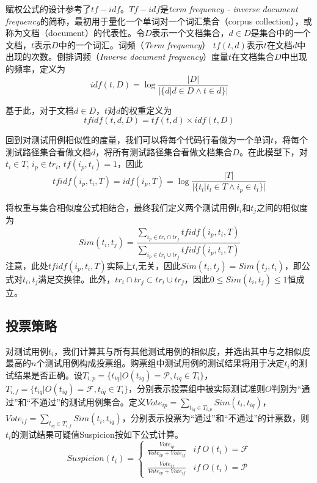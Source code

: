 赋权公式的设计参考了$tf-idf$\cite{wiki:tf-idf}。$Tf-idf$是\textit{term frequency - inverse document frequency}的简称，最初用于量化一个单词对一个词汇集合（corpus collection），或称为文档（document）的代表性。令$D$表示一个文档集合，$d \in D$是集合中的一个文档，$t$表示$D$中的一个词汇。词频（\textit{Term frequency}） $tf(t, d)$表示$t$在文档$d$中出现的次数。倒排词频（\textit{Inverse document frequency}）度量$t$在文档集合$D$中出现的频率，定义为
$$
idf(t, D) = \log{\frac{|D|}{|\{d| d \in D \wedge t \in d\}|}}
$$

基于此，对于文档$d \in D$，$t$对$d$的权重定义为
$$tfidf(t, d, D) = tf(t, d) \times idf(t, D)
$$

回到对测试用例相似性的度量，我们可以将每个代码行看做为一个单词$t$，将每个测试路径集合看做文档$d$，将所有测试路径集合看做文档集合$D$。在此模型下，对$t_i \in T$, $i_p \in tr_i$, $tf(i_p, t_i) = 1$，因此
$$
tfidf(i_p, t_i, T) = idf(i_p, T) = \log{\frac{|T|}{|\{t_l|t_l \in T \wedge i_p \in t_l\}|}}
$$

将权重与集合相似度公式相结合，最终我们定义两个测试用例$t_i$和$t_j$之间的相似度为
$$
Sim (t_i, t_j) = \frac{\sum_{i_p \in {tr}_i \cap {tr}_j}^{} tfidf(i_p, t_i, T)}{\sum_{i_p \in {tr}_i \cup {tr}_j}^{} tfidf(i_p, t_i, T)}
$$
注意，此处$tfidf(i_p, t_i, T)$实际上$t_i$无关，因此$Sim(t_i, t_j) = Sim(t_j, t_i)$，即公式对$t_i,t_j$满足交换律。此外，${tr}_i \cap {tr}_j \subset {tr}_i \cup {tr}_j$，因此$0 \le Sim(t_i, t_j) \le 1$恒成立。

\subsection{投票策略}
对测试用例$t_i$，我们计算其与所有其他测试用例的相似度，并选出其中与之相似度最高的$n$个测试用例构成投票组。购票组中测试用例的测试结果将用于决定$t_i$的测试结果是否正确。设$T_{i, p} = \{t_{iq} | O(t_{iq}) = \mathcal{P}, t_{iq}\in T_i\}$， $T_{i, f} = \{t_{iq} | O(t_{iq}) = \mathcal{F}, t_{iq}\in T_i\}$，分别表示投票组中被实际测试准则$O$判别为“通过”和“不通过”的测试用例集合。定义$Vote_{ip} = \sum_{t_{iq} \in T_{i, p}} Sim(t_i, t_{iq})$，$Vote_{if} = \sum_{t_{iq} \in T_{i, f}} Sim(t_i, t_{iq})$，分别表示投票为“通过”和“不通过”的计票数，则$t_i$的测试结果可疑值Suspicion按如下公式计算。
$$
Suspicion(t_i) = \left\{
\begin{array}{lr}
\frac {Vote_{ip}}{Vote_{ip} + Vote_{if}}     & if \ O(t_i) = \mathcal{F} \\
\frac {Vote_{if}}{Vote_{ip} + Vote_{if}}     & if \ O(t_i) = \mathcal{P}
\end{array}
\right.
$$

